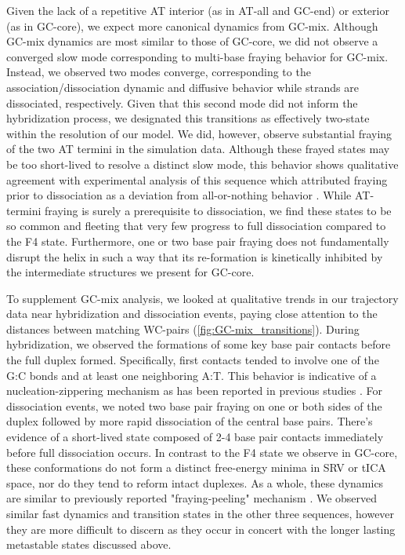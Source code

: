 \documentclass[journal=jpcbfk,manuscript=article]{achemso}
\begin{document}
Given the lack of a repetitive AT interior (as in AT-all and GC-end) or exterior (as in GC-core), we expect more canonical dynamics from GC-mix. Although GC-mix dynamics are most similar to those of GC-core, we did not observe a converged slow mode corresponding to multi-base fraying behavior for GC-mix. Instead, we observed two modes converge, corresponding to the association/dissociation dynamic and diffusive behavior while strands are dissociated, respectively. Given that this second mode did not inform the hybridization process, we designated this transitions as effectively two-state within the resolution of our model. We did, however, observe substantial fraying of the two AT termini in the simulation data. Although these frayed states may be too short-lived to resolve a distinct slow mode, this behavior shows qualitative agreement with experimental analysis of this sequence which attributed fraying prior to dissociation as a deviation from all-or-nothing behavior \citep{Sanstead2016}.  While AT-termini fraying is surely a prerequisite to dissociation, we find these states to be so common and fleeting that very few progress to full dissociation compared to the F4 state. Furthermore, one or two base pair fraying does not fundamentally disrupt the helix in such a way that its re-formation is kinetically inhibited by the intermediate structures we present for GC-core.  

To supplement GC-mix analysis, we looked at qualitative trends in our trajectory data near hybridization and dissociation events, paying close attention to the distances between matching WC-pairs (\ref{fig:GC-mix_transitions}). During hybridization, we observed the formations of some key base pair contacts before the full duplex formed. Specifically, first contacts tended to involve one of the G:C bonds and at least one neighboring A:T. This behavior is indicative of a nucleation-zippering mechanism as has been reported in previous studies \citep{Wetmur1968KineticsDNA, Porschke1971CooperativeTransition, Yin2011KineticsHybridization}. For dissociation events, we noted two base pair fraying on one or both sides of the duplex followed by more rapid dissociation of the central base pairs. There's evidence of a short-lived state composed of 2-4 base pair contacts immediately before full dissociation occurs. In contrast to the F4 state we observe in GC-core, these conformations do not form a distinct free-energy minima in SRV or tICA space, nor do they tend to reform intact duplexes. As a whole, these dynamics are similar to previously reported "fraying-peeling" mechanism \citep{Wong2008TheSimulations, Perez2010Real-timeUnfolding, Zgarbova2014BaseRNA}. We observed similar fast dynamics and transition states in the other three sequences, however they are more difficult to discern as they occur in concert with the longer lasting metastable states discussed above.
\end{document}
